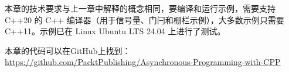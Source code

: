 

本章的技术要求与上一章中解释的概念相同，要编译和运行示例，需要支持 C++20 的 C++ 编译器（用于信号量、门闩和栅栏示例），大多数示例只需要 C++11。示例已在 Linux Ubuntu LTS 24.04 上进行了测试。

本章的代码可以在GitHub上找到： \url{https://github.com/PacktPublishing/Asynchronous-Programming-with-CPP}